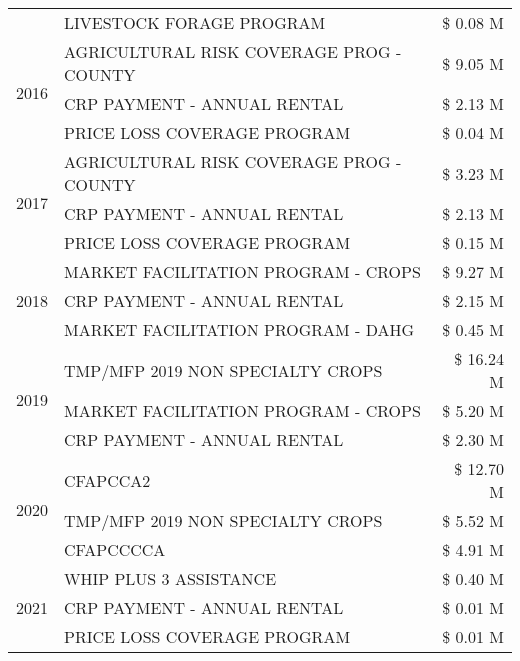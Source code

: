 \begin{tabular}{llr}
 & LIVESTOCK FORAGE PROGRAM & \$ 0.08 M \\
\cline{1-3}
\multirow[t]{3}{*}{2016} & AGRICULTURAL RISK COVERAGE PROG - COUNTY      & \$ 9.05 M \\
 & CRP PAYMENT - ANNUAL RENTAL                   & \$ 2.13 M \\
 & PRICE LOSS COVERAGE PROGRAM                   & \$ 0.04 M \\
\cline{1-3}
\multirow[t]{3}{*}{2017} & AGRICULTURAL RISK COVERAGE PROG - COUNTY & \$ 3.23 M \\
 & CRP PAYMENT - ANNUAL RENTAL & \$ 2.13 M \\
 & PRICE LOSS COVERAGE PROGRAM & \$ 0.15 M \\
\cline{1-3}
\multirow[t]{3}{*}{2018} & MARKET FACILITATION PROGRAM - CROPS & \$ 9.27 M \\
 & CRP PAYMENT - ANNUAL RENTAL & \$ 2.15 M \\
 & MARKET FACILITATION PROGRAM - DAHG & \$ 0.45 M \\
\cline{1-3}
\multirow[t]{3}{*}{2019} & TMP/MFP 2019 NON SPECIALTY CROPS & \$ 16.24 M \\
 & MARKET FACILITATION PROGRAM - CROPS & \$ 5.20 M \\
 & CRP PAYMENT - ANNUAL RENTAL & \$ 2.30 M \\
\cline{1-3}
\multirow[t]{3}{*}{2020} & CFAPCCA2 & \$ 12.70 M \\
 & TMP/MFP 2019 NON SPECIALTY CROPS & \$ 5.52 M \\
 & CFAPCCCCA & \$ 4.91 M \\
\cline{1-3}
\multirow[t]{3}{*}{2021} & WHIP PLUS 3 ASSISTANCE & \$ 0.40 M \\
 & CRP PAYMENT - ANNUAL RENTAL & \$ 0.01 M \\
 & PRICE LOSS COVERAGE PROGRAM & \$ 0.01 M \\
\cline{1-3}
\bottomrule
\end{tabular}
